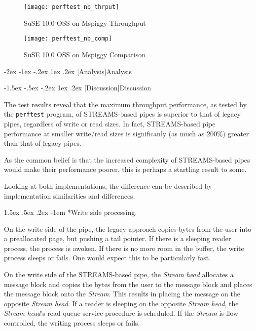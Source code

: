 \documentclass[letterpaper,final,notitlepage,twocolumn,10pt,twoside]{article}
\makeatletter
\let\large\normalsize
\let\normalsize\small
\let\small\footnotesize
\let\footnotesize\scriptsize
\let\scriptsize\tiny
\renewcommand\section{\@startsection {section}{1}{\z@}%
                                   {-2ex \@plus -1ex \@minus -.2ex}%
                                   {1ex \@plus .2ex}%
                                   {\normalfont\large\bfseries}}
\renewcommand\subsection{\@startsection{subsection}{2}{\z@}%
                                     {-1.5ex \@plus -.5ex \@minus -.2ex}%
                                     {1ex \@plus .2ex}%
                                     {\normalfont\normalsize\bfseries}}
\renewcommand\paragraph{\@startsection{paragraph}{4}{\z@}%
                                    {1.5ex \@plus .5ex \@minus .2ex}%
                                    {-1em}%
                                    {\normalfont\normalsize\bfseries\slshape}}
\makeatother
\begin{document}
\begin{figure}[p]
\texttt{[image: perftest\_nb\_thrput]}
\caption[SuSE 10.0 OSS on Mspiggy Throughput]{SuSE 10.0 OSS on Mspiggy Throughput}
\label{figure:nbthrput}
\end{figure}

\begin{figure}[p]
\texttt{[image: perftest\_nb\_comp]}
\caption[SuSE 10.0 OSS on Mspiggy Comparison]{SuSE 10.0 OSS on Mspiggy Comparison}
\label{figure:nbcomp}
\end{figure}

\section[Analysis]{Analysis}

\subsection[Discussion]{Discussion}

The test results reveal that the maximum throughput performance, as tested by
the \texttt{perftest} program, of STREAMS-based pipes is superior to that of
legacy pipes, regardless of write or read sizes.  In fact, STREAMS-based pipe
performance at smaller write/read sizes is significanly (as much as 200\%)
greater than that of legacy pipes.

As the common belief is that the increased complexity of STREAMS-based pipes
would make their performance poorer, this is perhaps a startling result to
some.

Looking at both implementations, the difference can be described by
implementation similarities and differences.

\paragraph*{Write side processing.}

On the write side of the pipe, the legacy approach copies bytes from the user
into a preallocated page, but pushing a tail pointer.  If there is a sleeping
reader process, the process is awoken.  If there is no more room in the
buffer, the write process sleeps or fails.  One would expect this to be
particularly fast.

On the write side of the STREAMS-based pipe, the \textit{Stream head}
allocates a message block and copies the bytes from the user to the message
block and places the message block onto the \textit{Stream}.  This results in
placing the message on the opposite \textit{Stream head}.  If a reader is
sleeping on the opposite \textit{Stream head}, the \textit{Stream head}'s read
queue service procedure is scheduled.  If the \textit{Stream} is flow
controlled, the writing process sleeps or fails.
\end{document}
